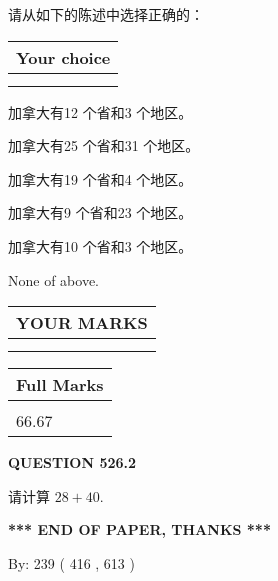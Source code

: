 \documentclass{ctexart}
\begin{document}
  
请从如下的陈述中选择正确的：
  
  
\noindent\hspace{3.0in} \begin{tabular}{|l|}
\hline
Your choice \\
\hline
 \\ 
 \\ 
\hline
\end{tabular}
  
  
 
 
加拿大有12 个省和3 个地区。
 
 
加拿大有25 个省和31 个地区。
 
 
加拿大有19 个省和4 个地区。
 
 
加拿大有9 个省和23 个地区。
 
 
加拿大有10 个省和3 个地区。
 
 
 None of above.
 
 
  
\vspace{0.2in}
  
\noindent\begin{tabular}{|l|}
\hline
 YOUR MARKS  \\
\hline
 \\ 
 \\ 
\hline
\end{tabular}
\hspace{0.05in} \begin{tabular}{|l|}
\hline
 Full Marks  \\
\hline
 \\ 
66.67 \\
\hline
\end{tabular}
{\textbf{\Large{QUESTION
526.2 
}}}
  
  
 
请计算 $ %
28 +  %
40 $.
 

 

 
   
   
 \vspace{0.2in}
 
   
   
   
   
\vspace{1.0in} 
{\textbf{\large{ *** END OF PAPER, THANKS *** }}} 
   
   
\hspace{1.0in} By: 
 239 ( 416 ,  613 )
   
\end{document}
